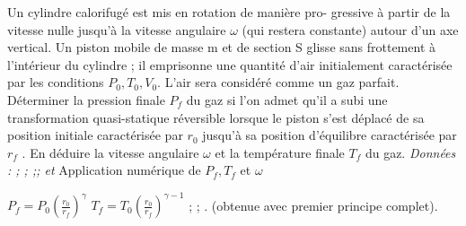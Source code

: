 \begin{Exercise}[title=piston en rotation autour d'un axe]
	Un cylindre calorifugé est mis en rotation de manière pro-
	gressive à partir de la vitesse nulle jusqu’à la vitesse angulaire $\omega$ (qui restera constante) autour d’un axe vertical.
	Un piston mobile de masse m et de section S glisse sans
	frottement à l’intérieur du cylindre ; il emprisonne une
	quantité d’air initialement caractérisée par les conditions
	${P_0 , T_0 , V_0 }$. L’air sera considéré comme un gaz parfait.
	\Question Déterminer la pression finale $P_f$ du gaz si l’on admet qu’il a subi une transformation quasi-statique réversible lorsque le piston s’est déplacé de sa position initiale caractérisée par $r_0$ jusqu’à sa position d’équilibre caractérisée par $r_f$ .
	\Question En déduire la vitesse angulaire $\omega$ et la température finale $T_f$ du gaz.
	\emph{Données :  ; ; ;;  et}
	\Question Application numérique de $P_f, T_f $ et $\omega$
\end{Exercise}
\begin{Answer}
	\Question $P_f= P_0 \left(\frac{r_0}{r_f}\right)^\gamma$
	\Question $T_f = T_0 \left(\frac{r_0}{r_f}\right)^{\gamma-1}$
	\Question {} ; ; . (obtenue avec premier principe complet).
\end{Answer}
